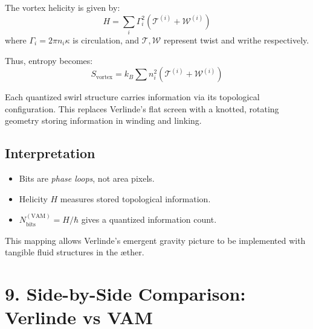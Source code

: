 \documentclass[11pt]{article}
\begin{document}
The vortex helicity is given by:
\begin{equation}
H = \sum_i \Gamma_i^2 (\mathcal{T}^{(i)} + \mathcal{W}^{(i)})
\end{equation}
where $\Gamma_i = 2\pi n_i \kappa$ is circulation, and $\mathcal{T}, \mathcal{W}$ represent twist and writhe respectively.

Thus, entropy becomes:
\begin{equation}
\boxed{
S_\text{vortex} = k_B \sum n_i^2 (\mathcal{T}^{(i)} + \mathcal{W}^{(i)})
}
\end{equation}

Each quantized swirl structure carries information via its topological configuration. This replaces Verlinde's flat screen with a knotted, rotating geometry storing information in winding and linking.

\subsection*{Interpretation}
\begin{itemize}
\item Bits are \textit{phase loops}, not area pixels.
    \item Helicity $H$ measures stored topological information.
    \item $N_\text{bits}^{(\text{VAM})} = H / \hbar$ gives a quantized information count.
\end{itemize}

This mapping allows Verlinde's emergent gravity picture to be implemented with tangible fluid structures in the æther.

\section*{9. Side-by-Side Comparison: Verlinde vs VAM}
\end{document}
